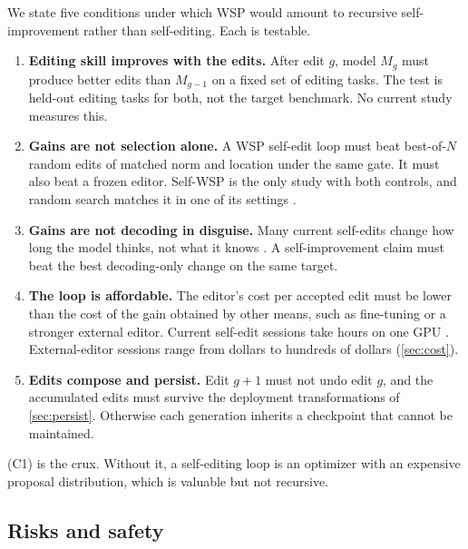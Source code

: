 We state five conditions under which WSP would amount to recursive self-improvement rather than self-editing. Each is testable.
\begin{enumerate}[label=(C\arabic*),leftmargin=*,itemsep=3pt]
\item \textbf{Editing skill improves with the edits.} After edit $g$, model $M_{g}$ must produce better edits than $M_{g-1}$ on a fixed set of editing tasks. The test is held-out editing tasks for both, not the target benchmark. No current study measures this.
\item \textbf{Gains are not selection alone.} A WSP self-edit loop must beat best-of-$N$ random edits of matched norm and location under the same gate. It must also beat a frozen editor. Self-WSP is the only study with both controls, and random search matches it in one of its settings \citep{ax2611_28833}.
\item \textbf{Gains are not decoding in disguise.} Many current self-edits change how long the model thinks, not what it knows \citep{ax2611_21885,ax2611_28833}. A self-improvement claim must beat the best decoding-only change on the same target.
\item \textbf{The loop is affordable.} The editor's cost per accepted edit must be lower than the cost of the gain obtained by other means, such as fine-tuning or a stronger external editor. Current self-edit sessions take hours on one GPU \citep{ax2611_21885}. External-editor sessions range from dollars to hundreds of dollars (\cref{sec:cost}).
\item \textbf{Edits compose and persist.} Edit $g{+}1$ must not undo edit $g$, and the accumulated edits must survive the deployment transformations of \cref{sec:persist}. Otherwise each generation inherits a checkpoint that cannot be maintained.
\end{enumerate}
(C1) is the crux. Without it, a self-editing loop is an optimizer with an expensive proposal distribution, which is valuable but not recursive.

\subsection{Risks and safety}
\label{sec:rsi-safety}

